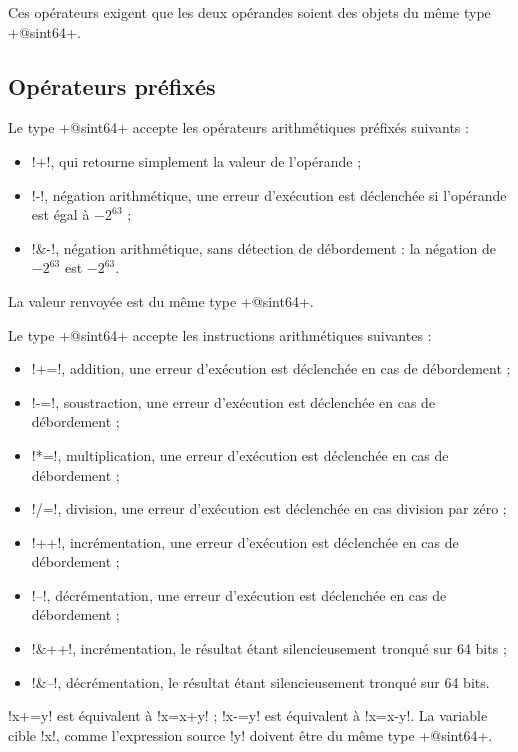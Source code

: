 Ces opérateurs exigent que les deux opérandes soient des objets du même type \ggst+@sint64+.

\subsection{Opérateurs préfixés}
Le type \ggst+@sint64+ accepte les opérateurs arithmétiques préfixés suivants :
\begin{itemize}
  \item \ggst!+!, qui retourne simplement la valeur de l'opérande ;
  \item \ggst!-!, négation arithmétique, une erreur d'exécution est déclenchée si l'opérande est égal à $-2^{63}$ ;
  \item \ggst!&-!, négation arithmétique, sans détection de débordement : la négation de $-2^{63}$ est $-2^{63}$.
\end{itemize}

La valeur renvoyée est du même type  \ggst+@sint64+.



Le type \ggst+@sint64+ accepte les instructions arithmétiques suivantes :
\begin{itemize}
  \item \ggst!+=!, addition, une erreur d'exécution est déclenchée en cas de débordement ;
  \item \ggst!-=!, soustraction, une erreur d'exécution est déclenchée en cas de débordement ;
  \item \ggst!*=!, multiplication, une erreur d'exécution est déclenchée en cas de débordement ;
  \item \ggst!/=!, division, une erreur d'exécution est déclenchée en cas division par zéro ;
  \item \ggst!++!, incrémentation, une erreur d'exécution est déclenchée en cas de débordement ;
  \item \ggst!--!, décrémentation, une erreur d'exécution est déclenchée en cas de débordement ;
  \item \ggst!&++!, incrémentation, le résultat étant silencieusement tronqué sur 64 bits ;
  \item \ggst!&--!, décrémentation, le résultat étant silencieusement tronqué sur 64 bits.
\end{itemize}

\ggst!x+=y! est équivalent à \ggst!x=x+y! ; \ggst!x-=y! est équivalent à \ggst!x=x-y!.
La variable cible \ggst!x!, comme l'expression source \ggst!y! doivent être du même type \ggst+@sint64+.

